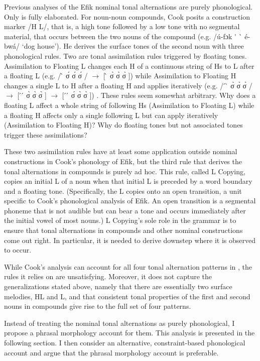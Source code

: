 \documentclass[output=paper]{langscibook}
\begin{document}
Previous analyses of the Efik nominal tonal alternations \citep{Welmers1973,Kim1974,Cook1985} are purely phonological. Only \citealt{Cook1985} is fully elaborated. For noun-noun compounds, Cook posits a construction marker /H L/, that is, a high tone followed by a low tone with no segmental material, that occurs between the two nouns of the compound (e.g. /ú-fɔk  \'{}   \`{}  é-bwá/ ‘dog house’). He derives the surface tones of the second noun with three phonological rules. Two are tonal assimilation rules triggered by floating tones. Assimilation to Floating L changes each H of a continuous string of Hs to L after a floating L  (e.g. / {}̀  σ́ σ́ σ́ / ${\rightarrow}$ [ {}̀ σ̀ σ̀ σ̀ ]) while Assimilation to Floating H changes a single L to H after a floating H and applies iteratively (e.g. / {}́  { }̀ σ̀ σ̀ σ̀ / ${\rightarrow}$ [ {}́  { }́ σ̀ σ̀ σ̀  ] ${\rightarrow}$ [  {}́  { }́ σ́ σ̀ σ̀ ]) \citep[193]{Cook1985}. These rules seem somewhat arbitrary. Why does a floating L affect a whole string of following Hs (Assimilation to Floating L) while a floating H affects only a single following L but can apply iteratively (Assimilation to Floating H)? Why do floating tones but not associated tones trigger these assimilations?\largerpage

These two assimilation rules have at least some application outside nominal constructions in Cook’s phonology of Efik, but the third rule that derives the tonal alternations in compounds is purely ad hoc. This rule, called L Copying, copies an initial L of a noun when that initial L is preceded by a word boundary and a floating tone. (Specifically, the L copies onto an open transition, a unit specific to Cook’s phonological analysis of Efik. An open transition is a segmental phoneme that is not audible but can bear a tone and occurs immediately after the initial vowel of most nouns.) L Copying’s sole role in the grammar is to ensure that tonal alternations in compounds and other nominal constructions come out right. In particular, it is needed to derive downstep where it is observed to occur. 

While Cook’s analysis can account for all four tonal alternation patterns in , the rules it relies on are unsatisfying. Moreover, it does not capture the generalizations stated above, namely that there are essentially two surface melodies, HL and L, and that consistent tonal properties of the first and second nouns in compounds give rise to the full set of four patterns. 

Instead of treating the nominal tonal alternations as purely phonological, I propose a phrasal morphology account for them. This analysis is presented in the following section. I then consider an alternative, constraint-based phonological account and argue that the phrasal morphology account is preferable. 
\end{document}
